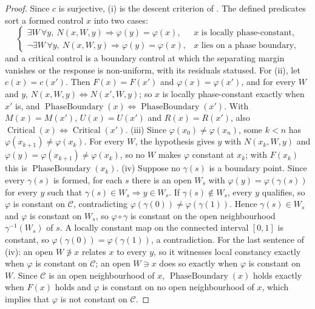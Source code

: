 \begin{proof}
Since \(c\) is surjective, (i) is the descent criterion of
.  The defined predicates sort a formed control \(x\) into two cases:
\[
  \begin{cases}
  \exists W\,\forall y,\ N(x,W,y)\Rightarrow\varphi(y)=\varphi(x),
    &\text{\(x\) is locally phase-constant,}\\
  \neg\exists W\,\forall y,\ N(x,W,y)\Rightarrow\varphi(y)=\varphi(x),
    &\text{\(x\) lies on a phase boundary,}
  \end{cases}
\]
and a critical control is a boundary control at which the separating margin
vanishes or the response is non-uniform, with its residuals statused.
For (ii), let \(c(x)=c(x')\). Then \(F(x)=F(x')\) and
\(\varphi(x)=\varphi(x')\), and for every \(W\) and \(y\),
\(N(x,W,y)\iff N(x',W,y)\); so \(x\) is locally phase-constant exactly when
\(x'\) is, and \(\operatorname{PhaseBoundary}(x)\iff
\operatorname{PhaseBoundary}(x')\). With \(M(x)=M(x')\), \(U(x)=U(x')\) and
\(R(x)=R(x')\), also \(\operatorname{Critical}(x)\iff
\operatorname{Critical}(x')\).
(iii) Since \(\varphi(x_0)\ne\varphi(x_n)\), some \(k<n\) has
\(\varphi(x_{k+1})\ne\varphi(x_k)\). For every \(W\), the hypothesis gives
\(y\) with \(N(x_k,W,y)\) and \(\varphi(y)=\varphi(x_{k+1})\ne\varphi(x_k)\), so
no \(W\) makes \(\varphi\) constant at \(x_k\); with \(F(x_k)\) this is
\(\operatorname{PhaseBoundary}(x_k)\).
(iv) Suppose no \(\gamma(s)\) is a boundary point. Since every
\(\gamma(s)\) is formed, for each \(s\) there is an open \(W_s\) with
\(\varphi(y)=\varphi(\gamma(s))\) for every \(y\) such that
\(\gamma(s)\in W_s\Rightarrow y\in W_s\). If \(\gamma(s)\notin W_s\), every
\(y\) qualifies, so \(\varphi\) is constant on \(\mathcal C\), contradicting
\(\varphi(\gamma(0))\ne\varphi(\gamma(1))\). Hence \(\gamma(s)\in W_s\) and
\(\varphi\) is constant on \(W_s\), so \(\varphi\circ\gamma\) is constant on
the open neighbourhood \(\gamma^{-1}(W_s)\) of \(s\). A locally constant map
on the connected interval \([0,1]\) is constant, so
\(\varphi(\gamma(0))=\varphi(\gamma(1))\), a contradiction.
For the last sentence of (iv): an open \(W\not\ni x\) relates \(x\) to every
\(y\), so it witnesses local constancy exactly when \(\varphi\) is constant on
\(\mathcal C\); an open \(W\ni x\) does so exactly when \(\varphi\) is constant on
\(W\). Since \(\mathcal C\) is an open neighbourhood of \(x\),
\(\operatorname{PhaseBoundary}(x)\) holds exactly when \(F(x)\) holds and
\(\varphi\) is constant on no open neighbourhood of \(x\), which implies that
\(\varphi\) is not constant on \(\mathcal C\).
\end{proof}


